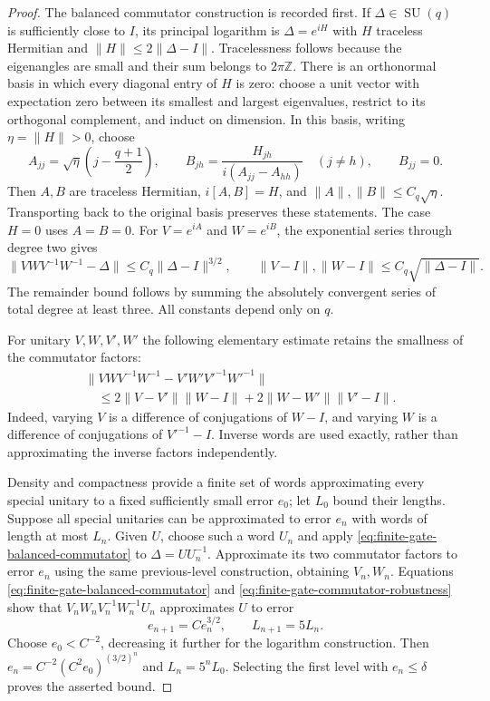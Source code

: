 \documentclass[11pt]{article}
\begin{document}
\begin{proof}
The balanced commutator construction is recorded first. If
$\Delta\in\operatorname{SU}(q)$ is sufficiently close to $I$, its
principal logarithm is $\Delta=e^{iH}$ with $H$ traceless Hermitian and
$\|H\|\leq2\|\Delta-I\|$. Tracelessness follows because the eigenangles
are small and their sum belongs to $2\pi\mathbb Z$.
There is an orthonormal basis in which every diagonal entry of $H$ is zero:
choose a unit vector with expectation zero between its smallest and largest
eigenvalues, restrict to its orthogonal complement, and induct on dimension.
In this basis, writing $\eta=\|H\|>0$, choose
\begin{equation}
 A_{jj}=\sqrt\eta\left(j-\frac{q+1}{2}\right),\qquad
 B_{jh}=\frac{H_{jh}}{i(A_{jj}-A_{hh})}\quad(j\ne h),\qquad B_{jj}=0.
\end{equation}
Then $A,B$ are traceless Hermitian, $i[A,B]=H$, and
$\|A\|,\|B\|\leq C_q\sqrt\eta$. Transporting back to the original
basis preserves these statements. The case $H=0$ uses $A=B=0$.
For $V=e^{iA}$ and $W=e^{iB}$, the exponential series through degree two gives
\begin{equation}\label{eq:finite-gate-balanced-commutator}
 \|VWV^{-1}W^{-1}-\Delta\|
 \leq C_q\|\Delta-I\|^{3/2},\qquad
 \|V-I\|,\|W-I\|\leq C_q\sqrt{\|\Delta-I\|}.
\end{equation}
The remainder bound follows by summing the absolutely convergent series of
total degree at least three. All constants depend only on $q$.

For unitary $V,W,V',W'$ the following elementary estimate retains the
smallness of the commutator factors:
\begin{align}\label{eq:finite-gate-commutator-robustness}
 &\|VWV^{-1}W^{-1}-V'W'V'^{-1}W'^{-1}\|\\
 &\quad\leq2\|V-V'\|\|W-I\|
       +2\|W-W'\|\|V'-I\|.\nonumber
\end{align}
Indeed, varying $V$ is a difference of conjugations of $W-I$, and varying
$W$ is a difference of conjugations of $V'^{-1}-I$. Inverse words are used
exactly, rather than approximating the inverse factors independently.

Density and compactness provide a finite set of words approximating every
special unitary to a fixed sufficiently small error $e_0$; let $L_0$ bound
their lengths. Suppose all special unitaries can be approximated to error
$e_n$ with words of length at most $L_n$. Given $U$, choose such a word $U_n$
and apply \eqref{eq:finite-gate-balanced-commutator} to
$\Delta=UU_n^{-1}$. Approximate its two commutator factors to error $e_n$
using the same previous-level construction, obtaining $V_n,W_n$.
Equations \eqref{eq:finite-gate-balanced-commutator} and
\eqref{eq:finite-gate-commutator-robustness} show that
$V_nW_nV_n^{-1}W_n^{-1}U_n$ approximates $U$ to error
\begin{equation}
 e_{n+1}=C e_n^{3/2},\qquad L_{n+1}=5L_n.
\end{equation}
Choose $e_0<C^{-2}$, decreasing it further for the logarithm construction.
Then $e_n=C^{-2}(C^2e_0)^{(3/2)^n}$ and $L_n=5^nL_0$.
Selecting the first level with $e_n\leq\delta$ proves the asserted bound.
\end{proof}
\end{document}
